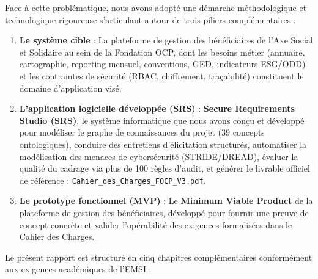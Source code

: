 Face à cette problématique, nous avons adopté une démarche méthodologique et technologique rigoureuse s'articulant autour de trois piliers complémentaires :
\begin{enumerate}
    \item \textbf{Le système cible} : La plateforme de gestion des bénéficiaires de l'Axe Social et Solidaire au sein de la Fondation OCP, dont les besoins métier (annuaire, cartographie, reporting mensuel, conventions, GED, indicateurs ESG/ODD) et les contraintes de sécurité (RBAC, chiffrement, traçabilité) constituent le domaine d'application visé.
    \item \textbf{L'application logicielle développée (SRS)} : \textbf{Secure Requirements Studio (SRS)}, le système informatique que nous avons conçu et développé pour modéliser le graphe de connaissances du projet (39 concepts ontologiques), conduire des entretiens d'élicitation structurés, automatiser la modélisation des menaces de cybersécurité (STRIDE/DREAD), évaluer la qualité du cadrage via plus de 100 règles d'audit, et générer le livrable officiel de référence : \texttt{Cahier\_des\_Charges\_FOCP\_V3.pdf}.
    \item \textbf{Le prototype fonctionnel (MVP)} : Le \textbf{Minimum Viable Product} de la plateforme de gestion des bénéficiaires, développé pour fournir une preuve de concept concrète et valider l'opérabilité des exigences formalisées dans le Cahier des Charges.
\end{enumerate}

Le présent rapport est structuré en cinq chapitres complémentaires conformément aux exigences académiques de l'EMSI :

